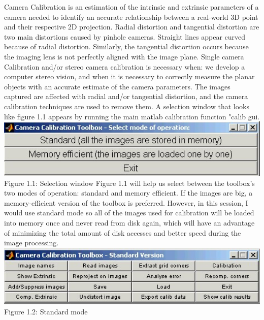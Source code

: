 \documentclass[a4paper, 12pt]{report}
\begin{document}
 Camera Calibration is an estimation of the intrinsic and extrinsic parameters of a camera needed to identify an accurate relationship between a real-world 3D point and their respective 2D projection. Radial distortion and tangential distortion are two main distortions caused by pinhole cameras. Straight lines appear curved because of radial distortion. Similarly, the tangential distortion occurs because the imaging lens is not perfectly aligned with the image plane. Single camera Calibration and/or stereo camera calibration is necessary when: we develop a computer stereo vision, and when it is necessary to correctly measure the planar objects with an accurate estimate of the camera parameters. The images captured are affected with radial and/or tangential distortion, and the camera calibration techniques are used to remove them. \newline \newline
 A selection window that looks like figure 1.1 appears by running the main matlab calibration function "calib gui.
 \newline \includegraphics[width=1.0\textwidth]{resources/image/1.jpg} \newline 
 Figure 1.1: Selection window \newline \newline 
 Figure 1.1 will help us select between the toolbox's two modes of operation: standard and memory efficient. If the images are big, a memory-efficient version of the toolbox is preferred. However, in this session, I would use standard mode so all of the images used for calibration will be loaded into memory once and never read from disk again, which will have an advantage of minimizing the total amount of disk accesses and better speed during the image processing. \newline
 \includegraphics[width=1.0\textwidth]{resources/image/2.jpg} \newline
 Figure 1.2: Standard mode \newline
\end{document}
